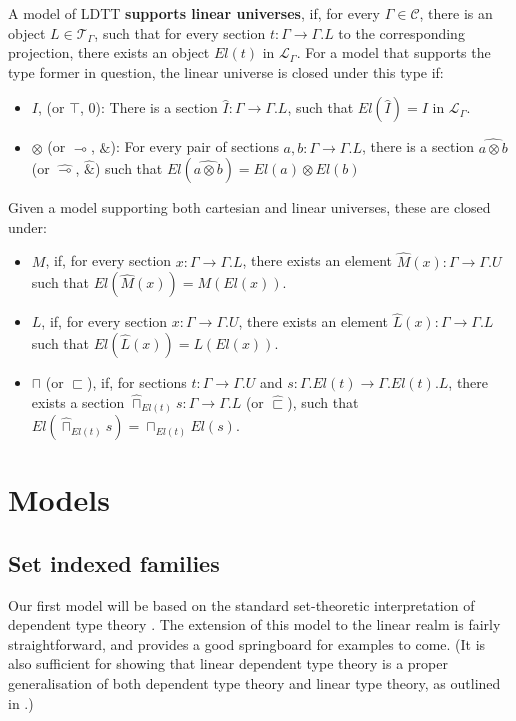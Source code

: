 \begin{defn}
  A model of LDTT \textbf{supports linear universes}, if, for every $\Gamma \in \mathcal{C}$, there is an object $L \in \mathcal{T}_{\Gamma}$, such that for every section $t : \Gamma \to \Gamma.L$ to the corresponding projection, there exists an object $El(t)$ in $\mathcal{L}_{\Gamma}$. For a model that supports the type former in question, the linear universe is closed under this type if:
  \begin{itemize}
    \item $I$, (or $\top$, $0$): There is a section $\hat I : \Gamma \to \Gamma.L$, such that $El(\hat I) = I$ in $\mathcal{L}_\Gamma$.
    \item $\otimes$ (or $\multimap$, $\&$): For every pair of sections $a, b : \Gamma \to \Gamma.L$, there is a section $\hat{a\otimes b}$ (or $\hat \multimap$, $\hat \&$) such that $El(\hat{a\otimes b}) = El(a)\otimes El(b)$
    \end{itemize}
  \end{defn}
  \begin{defn}
    Given a model supporting both cartesian and linear universes, these are closed under:
    \begin{itemize}
    \item $M$, if, for every section $x : \Gamma \to \Gamma.L$, there exists an element $\hat M(x) : \Gamma \to \Gamma.U$ such that $El(\hat M(x)) = M(El(x))$.
    \item $L$, if, for every section $x : \Gamma \to \Gamma.U$, there exists an element $\hat L(x) : \Gamma \to \Gamma.L$ such that $El(\hat L(x)) = L(El(x))$.
    \item $\sqcap$ (or $\sqsubset$), if, for sections $t : \Gamma \to \Gamma.U$ and $s : \Gamma.El(t) \to \Gamma.El(t).L$, there exists a section $\hat \sqcap_{El(t)}s : \Gamma \to \Gamma.L$ (or $\hat \sqsubset$), such that $El(\hat \sqcap_{El(t)}s) = \sqcap_{El(t)}El(s)$.
    \end{itemize}
\end{defn}


\newpage
\section{Models}
\subsection{Set indexed families}
Our first model will be based on the standard set-theoretic interpretation of dependent type theory \cite{hofmann1997syntax}. The extension of this model to the linear realm is fairly straightforward, and provides a good springboard for examples to come. (It is also sufficient for showing that linear dependent type theory is a proper generalisation of both dependent type theory and linear type theory, as outlined in \cite{vakar14}.)

